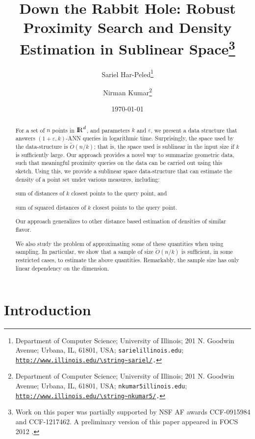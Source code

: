 \documentclass[12pt]{article}
\makeatletter
\newcommand{\Term}[1]{\textsf{#1}}
\newcommand{\TermI}[1]{\Term{#1}\index{#1@\Term{#1}}}
\theoremstyle{remark}{\theorembodyfont{\rm} \newtheorem{remark}[theorem]{Remark}}
\newcommand{\eps}{{\varepsilon}}\newcommand{\divides}{|}
\newcommand{\SarielThanks}[1]{\thanks{Department of Computer
      Science; 
      University of Illinois; 
      201 N. Goodwin Avenue;
      Urbana, IL, 61801, USA;
      {\tt sariel\atgen{}illinois.edu}; {\tt
         \url{http://www.illinois.edu/\string~sariel/}.} #1}}
\newcommand{\NirmanThanks}[1]{\thanks{Department of Computer
      Science; 
      University of Illinois; 
      201 N. Goodwin Avenue;
      Urbana, IL, 61801, USA;
      {\tt \si{nkumar5}\atgen{}illinois.edu}; {\tt
         \url{http://www.illinois.edu/\string~\si{nkumar5}/}.} #1}}
\newcommand{\atgen}{\symbol{'100}}
\providecommand{\si}[1]{#1}
\newcommand{\ANN}{\TermI{ANN}\xspace}
\renewcommand{\Re}{{\rm I\!\hspace{-0.025em} R}}
\newcommand{\Otilde}{\widetilde{O}}
\makeatother
\begin{document}
\title{Down the Rabbit Hole: Robust Proximity Search and Density
   Estimation in Sublinear Space\footnote{Work on this paper was partially supported by NSF AF awards
      CCF-0915984 and CCF-1217462. A preliminary version of this paper appeared in FOCS 2012
      \cite{hk-drhrp-12}.}}


\author{Sariel Har-Peled\SarielThanks{}\and Nirman Kumar\NirmanThanks{}}

\date{\today}



\maketitle


\begin{abstract}
    For a set of $n$ points in $\Re^d$, and parameters $k$ and $\eps$,
    we present a data structure that answers $(1+\eps,k)$-\ANN queries
    in logarithmic time.  Surprisingly, the space used by the
    data-structure is $\Otilde (n /k)$; that is, the space used is
    sublinear in the input size if $k$ is sufficiently large. Our
    approach provides a novel way to summarize geometric data, such
    that meaningful proximity queries on the data can be carried out
    using this sketch. Using this, we provide a sublinear space
    data-structure that can estimate the density of a point set under
    various measures, including:
    \begin{inparaenum}[(i)]
        \item sum of distances of $k$ closest points to the query
        point, and
        \item sum of squared distances of $k$ closest points to the
        query point.
    \end{inparaenum}
    Our approach generalizes to other distance based estimation of
    densities of similar flavor.

    We also study the problem of approximating some of these
    quantities when using sampling. In particular, we show that a
    sample of size $\Otilde (n /k)$ is sufficient, in some restricted
    cases, to estimate the above quantities. Remarkably, the sample
    size has only linear dependency on the dimension.
\end{abstract}


\section{Introduction}
\end{document}
